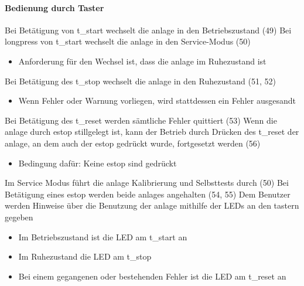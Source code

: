 \paragraph{Bedienung durch Taster}
\begin{itemize}
     Bei Betätigung von \gls{t_start} wechselt die \gls{anlage} in den Betriebszustand (49)
     Bei \gls{longpress} von \gls{t_start} wechselt die \gls{anlage} in den Service-Modus (50)
    \begin{itemize}
        \item Anforderung für den Wechsel ist, dass die \gls{anlage} im Ruhezustand ist
    \end{itemize}
     Bei Betätigung des \gls{t_stop} wechselt die \gls{anlage} in den Ruhezustand (51, 52)
    \begin{itemize}
        \item Wenn Fehler oder Warnung vorliegen, wird stattdessen ein Fehler ausgesandt  %
    \end{itemize}
     Bei Betätigung des \gls{t_reset} werden sämtliche Fehler quittiert (53) %
     Wenn die \gls{anlage} durch \gls{estop} stillgelegt ist, kann der Betrieb durch Drücken des
    \gls{t_reset} der \gls{anlage}, an dem auch der \gls{estop} gedrückt wurde, fortgesetzt werden (56) %
    \begin{itemize}
        \item Bedingung dafür: Keine \gls{estop} sind gedrückt
    \end{itemize}
     Im Service Modus führt die \gls{anlage} Kalibrierung und Selbsttests durch (50) %
     Bei Betätigung eines \gls{estop} werden beide \glspl{anlage} angehalten (54, 55)
     Dem Benutzer werden Hinweise über die Benutzung der \gls{anlage} mithilfe der LEDs an den \gls{taster}n gegeben
    \begin{itemize}
        \item Im Betriebszustand ist die LED am \gls{t_start} an
        \item Im Ruhezustand die LED am \gls{t_stop}
        \item Bei einem gegangenen oder bestehenden Fehler ist die LED am \gls{t_reset} an
    \end{itemize}
\end{itemize}

